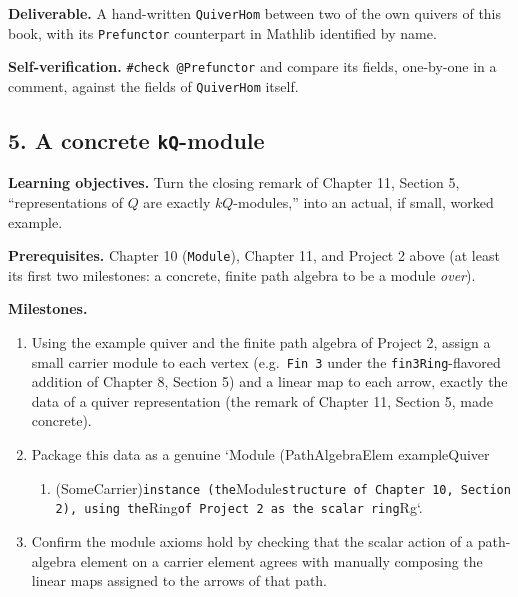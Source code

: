 \textbf{Deliverable.} A hand-written \texttt{QuiverHom} between two of the own quivers of this book, with its \texttt{Prefunctor} counterpart in Mathlib identified by name.

\textbf{Self-verification.} \texttt{\#check @Prefunctor} and compare its fields, one-by-one in a comment, against the fields of \texttt{QuiverHom} itself.

\subsection{\texorpdfstring{5. A concrete \texttt{kQ}-module}{5. A concrete kQ-module}}\label{sec:13-next-steps:03-next-projects:6}

\textbf{Learning objectives.} Turn the closing remark of Chapter 11, Section 5, ``representations of \(Q\) are exactly \(kQ\)-modules,'' into an actual, if small, worked example.

\textbf{Prerequisites.} Chapter 10 (\texttt{Module}), Chapter 11, and Project 2 above (at least its first two milestones: a concrete, finite path algebra to be a module \emph{over}).

\textbf{Milestones.}

\begin{enumerate}
\def\labelenumi{\arabic{enumi}.}
\tightlist
\item
  Using the example quiver and the finite path algebra of Project 2, assign a small carrier module to each vertex (e.g.~\texttt{Fin 3} under the \texttt{fin3Ring}-flavored addition of Chapter 8, Section 5) and a linear map to each arrow, exactly the data of a quiver representation (the remark of Chapter 11, Section 5, made concrete).
\item
  Package this data as a genuine `Module (PathAlgebraElem exampleQuiver

  \begin{enumerate}
  \def\labelenumii{\alph{enumii})}
  \setcounter{enumii}{10}
  \tightlist
  \item
    (SomeCarrier)\texttt{instance (the}Module\texttt{structure of Chapter 10, Section 2), using the}Ring\texttt{of Project 2 as the scalar ring}Rg`.
  \end{enumerate}
\item
  Confirm the module axioms hold by checking that the scalar action of a path-algebra element on a carrier element agrees with manually composing the linear maps assigned to the arrows of that path.
\end{enumerate}

